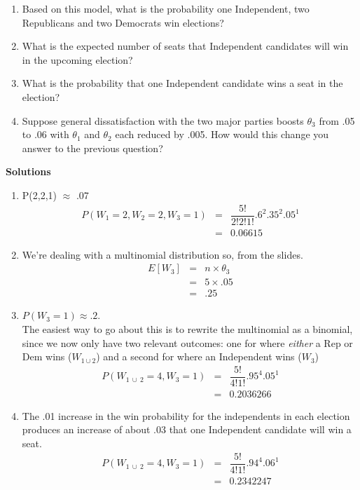\documentclass[11pt]{article}
\begin{document}
\begin{enumerate}
\item Based on this model, what is the probability one Independent, two Republicans and two Democrats win elections?
\item What is the expected number of seats that Independent candidates will win in the upcoming election?  
\item What is the probability that one Independent candidate wins a seat in the election?
\item Suppose general dissatisfaction with the two major parties boosts $\theta_3$ from .05 to .06 with $\theta_1$ and $\theta_2$ each reduced by .005. How would this change you answer to the previous question?
\end{enumerate}

\bigskip

\textbf{Solutions}
\begin{enumerate}
\item
	P(2,2,1) $\approx$ .07
	\begin{eqnarray*}
	P(W_1=2, W_2=2, W_3=1) &=& \dfrac{5!}{2!2!1!} .6^2 .35^2 .05^1\\
	&=& 0.06615	
	\end{eqnarray*}

\item
	We're dealing with a multinomial distribution so, from the slides. 
	\begin{eqnarray*}
	E[W_3] &=& n \times \theta_3\\
		&=& 5 \times .05\\
		&=& .25
	\end{eqnarray*}

\item
$P(W_3 = 1) \approx .2$.\\
The easiest way to go about this is to rewrite the multinomial as a binomial, since we now only have two relevant outcomes: one for where \textit{either} a Rep or Dem wins ($W_{1 \cup 2}$) and a second for where an Independent wins ($W_{3}$)
	\begin{eqnarray*}
	P(W_{1 \ \cup \ 2}=4, W_3=1) &=& \dfrac{5!}{4!1!} .95^4 .05^1\\
	&=& 0.2036266	
	\end{eqnarray*}
\item The .01 increase in the win probability for the independents in each election produces an increase of about .03 that one Independent candidate will win a seat. 
	\begin{eqnarray*}
	P(W_{1 \ \cup \ 2}=4, W_3=1) &=& \dfrac{5!}{4!1!} .94^4 .06^1\\
	&=& 0.2342247
	\end{eqnarray*}

\end{enumerate}
\end{document}
